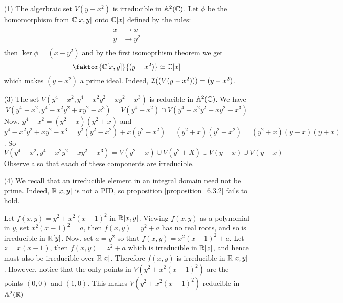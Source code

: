 \begin{example}\label{example_10.5}
  \begin{enumerate}
    \item[(1)] The algerbraic set $V(y-x^2)$ is irreducible in
      $\mathbb{A}^2(\mathbb{C})$. Let $\phi$ be the homomorphism from $\mathbb{C}[x,y]$ onto
      $\mathbb{C}[x]$ defined by the rules:
      \begin{align*}
        x & \xrightarrow{} x \\
        y & \xrightarrow{} y^2 \\
      \end{align*}
      then $\ker{\phi}=(x-y^2)$ and by the first isomoprhism theorem
      we get
      \begin{equation*}
        \faktor{\C[x,y]}{(y-x^2)} \simeq \C[x]
      \end{equation*}
      which makes $(y-x^2)$ a prime ideal. Indeed,
      $\mathcal{I}((V(y-x^2)))=(y-x^2)$.

    \item[(3)] The set $V(y^4-x^2, y^4-x^2y^2+xy^2-x^3)$ is reducible
      in $\mathbb{A}^2(\mathbb{C})$. We have
      \begin{equation*}
        V(y^4-x^2, y^4-x^2y^2+xy^2-x^3)=
        V(y^4-x^2) \cap V(y^4-x^2y^2+xy^2-x^3)
      \end{equation*}
      Now, $y^4-x^2=(y^2-x)(y^2+x)$ and $y^4-x^2y^2+xy^2-x^3=
      y^2(y^2-x^2)+x(y^2-x^2)=(y^2+x)(y^2-x^2)=(y^2+x)(y-x)(y+x)$. So
      \begin{equation*}
        V(y^4-x^2, y^4-x^2y^2+xy^2-x^3)=
        V(y^2-x) \cup V(y^2+X) \cup V(y-x) \cup V(y-x)
      \end{equation*}
      Observe also that eaach of these components are irreducible.

    \item[(4)] We recall that an irreducible element in an integral
      domain need not be prime. Indeed, $\mathbb{R}[x,y]$ is not a PID, so
      proposition \ref{proposition_6.3.2} fails to hold.

      Let $f(x,y)=y^2+x^2(x-1)^2$ in $\mathbb{R}[x,y]$. Viewing $f(x,y)$ as a
      polynomial in $y$, set $x^2(x-1)^2=a$, then $f(x,y)=y^2+a$ has
      no real roots, and so is irreducible in $\mathbb{R}[y]$. Now, set
      $a=y^2$ so that $f(x,y)=x^2(x-1)^2+a$. Let $z=x(x-1)$, then
      $f(x,y)=z^2+a$ which is irreducible in $\mathbb{R}[z]$, and hence must
      also be irreducible over $\mathbb{R}[x]$. Therefore $f(x,y)$ is
      irreducible in $\mathbb{R}[x,y]$. However, notice that the only points
      in $V(y^2+x^2(x-1)^2)$ are the points $(0,0)$ and $(1,0)$. This
      makes $V(y^2+x^2(x-1)^2)$ reducible in $\mathbb{A}^2(\mathbb{R})$


\end{enumerate}
\end{example}
